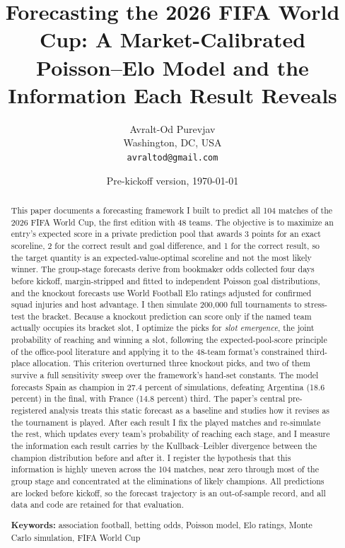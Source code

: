 \documentclass[11pt,letterpaper]{article}
\title{\textbf{Forecasting the 2026 FIFA World Cup: A Market-Calibrated Poisson--Elo Model and the Information Each Result Reveals}}
\author{Avralt-Od Purevjav\\ \small Washington, DC, USA \\ \small \texttt{avraltod@gmail.com}}
\date{Pre-kickoff version, \today}
\begin{document}
\maketitle

\begin{abstract}
\noindent This paper documents a forecasting framework I built to predict all 104 matches of the 2026 FIFA World Cup, the first edition with 48 teams. The objective is to maximize an entry's expected score in a private prediction pool that awards 3 points for an exact scoreline, 2 for the correct result and goal difference, and 1 for the correct result, so the target quantity is an expected-value-optimal scoreline and not the most likely winner. The group-stage forecasts derive from bookmaker odds collected four days before kickoff, margin-stripped and fitted to independent Poisson goal distributions, and the knockout forecasts use World Football Elo ratings adjusted for confirmed squad injuries and host advantage. I then simulate 200{,}000 full tournaments to stress-test the bracket. Because a knockout prediction can score only if the named team actually occupies its bracket slot, I optimize the picks for \emph{slot emergence}, the joint probability of reaching and winning a slot, following the expected-pool-score principle of the office-pool literature and applying it to the 48-team format's constrained third-place allocation. This criterion overturned three knockout picks, and two of them survive a full sensitivity sweep over the framework's hand-set constants. The model forecasts Spain as champion in 27.4 percent of simulations, defeating Argentina (18.6 percent) in the final, with France (14.8 percent) third. The paper's central pre-registered analysis treats this static forecast as a baseline and studies how it revises as the tournament is played. After each result I fix the played matches and re-simulate the rest, which updates every team's probability of reaching each stage, and I measure the information each result carries by the Kullback--Leibler divergence between the champion distribution before and after it. I register the hypothesis that this information is highly uneven across the 104 matches, near zero through most of the group stage and concentrated at the eliminations of likely champions. All predictions are locked before kickoff, so the forecast trajectory is an out-of-sample record, and all data and code are retained for that evaluation.

\medskip
\noindent\textbf{Keywords:} association football, betting odds, Poisson model, Elo ratings, Monte Carlo simulation, FIFA World Cup
\end{abstract}
\end{document}
